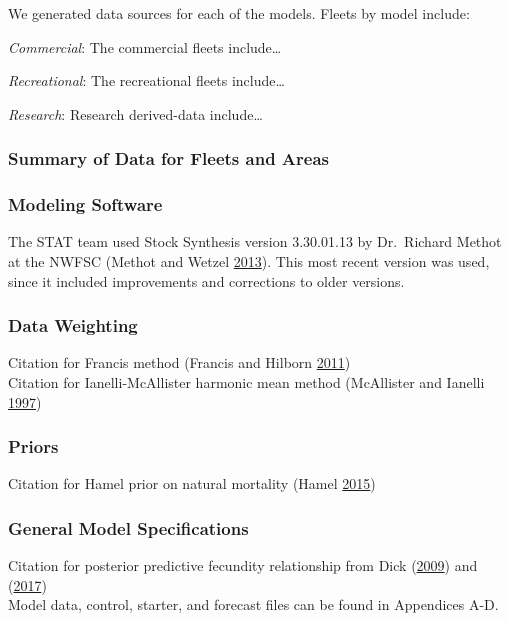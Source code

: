 \documentclass[12pt,]{article}
\begin{document}
We generated data sources for each of the models. Fleets by model
include:

\emph{Commercial}: The commercial fleets include\ldots{}

\emph{Recreational}: The recreational fleets include\ldots{}

\emph{Research}: Research derived-data include\ldots{}

\subsubsection{Summary of Data for Fleets and
Areas}\label{summary-of-data-for-fleets-and-areas}

\subsubsection{Modeling Software}\label{modeling-software}

The STAT team used Stock Synthesis version 3.30.01.13 by Dr.~Richard
Methot at the NWFSC (Methot and Wetzel
\protect\hyperlink{ref-methot_stock_2013}{2013}). This most recent
version was used, since it included improvements and corrections to
older versions.

\subsubsection{Data Weighting}\label{data-weighting}

Citation for Francis method (Francis and Hilborn
\protect\hyperlink{ref-francis_data_2011}{2011})\\
Citation for Ianelli-McAllister harmonic mean method (McAllister and
Ianelli \protect\hyperlink{ref-mcallister_bayesian_1997}{1997})

\subsubsection{Priors}\label{priors}

Citation for Hamel prior on natural mortality (Hamel
\protect\hyperlink{ref-hamel_method_2015}{2015})

\subsubsection{General Model
Specifications}\label{general-model-specifications}

Citation for posterior predictive fecundity relationship from Dick
(\protect\hyperlink{ref-dick_modeling_2009}{2009}) and
(\protect\hyperlink{ref-dick_meta-analysis_2017}{2017})\\
Model data, control, starter, and forecast files can be found in
Appendices A-D.
\end{document}
